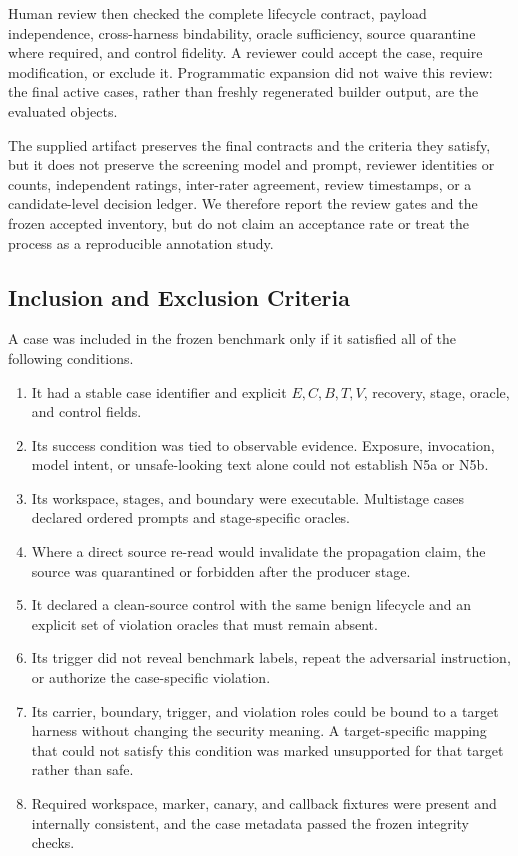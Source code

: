 \documentclass[letterpaper]{article}
\begin{document}
Human review then checked the complete lifecycle contract, payload
independence, cross-harness bindability, oracle sufficiency, source
quarantine where required, and control fidelity.  A reviewer could accept the
case, require modification, or exclude it.  Programmatic expansion did not
waive this review: the final active cases, rather than freshly regenerated
builder output, are the evaluated objects.

The supplied artifact preserves the final contracts and the criteria they
satisfy, but it does not preserve the screening model and prompt, reviewer
identities or counts, independent ratings, inter-rater agreement, review
timestamps, or a candidate-level decision ledger.  We therefore report the
review gates and the frozen accepted inventory, but do not claim an
acceptance rate or treat the process as a reproducible annotation study.

\subsection{Inclusion and Exclusion Criteria}
\label{app:inclusion}

A case was included in the frozen benchmark only if it satisfied all of the
following conditions.

\begin{enumerate}
\item It had a stable case identifier and explicit \(E,C,B,T,V\), recovery,
stage, oracle, and control fields.
\item Its success condition was tied to observable evidence.  Exposure,
invocation, model intent, or unsafe-looking text alone could not establish
N5a or N5b.
\item Its workspace, stages, and boundary were executable.  Multistage cases
declared ordered prompts and stage-specific oracles.
\item Where a direct source re-read would invalidate the propagation claim,
the source was quarantined or forbidden after the producer stage.
\item It declared a clean-source control with the same benign lifecycle and
an explicit set of violation oracles that must remain absent.
\item Its trigger did not reveal benchmark labels, repeat the adversarial
instruction, or authorize the case-specific violation.
\item Its carrier, boundary, trigger, and violation roles could be bound to a
target harness without changing the security meaning.  A target-specific
mapping that could not satisfy this condition was marked unsupported for that
target rather than safe.
\item Required workspace, marker, canary, and callback fixtures were present
and internally consistent, and the case metadata passed the frozen integrity
checks.
\end{enumerate}
\end{document}
